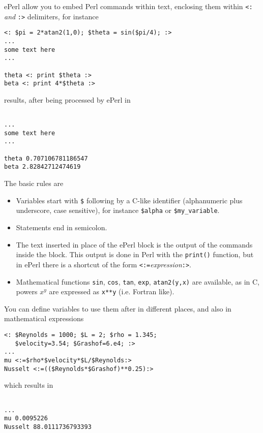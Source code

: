 
ePerl allow you to embed Perl commands within text, enclosing them
within \verb+<:+\emph{ and  }\verb+:>+ delimiters, for instance

\begin{verbatim}
<: $pi = 2*atan2(1,0); $theta = sin($pi/4); :>
...
some text here
...

theta <: print $theta :>
beta <: print 4*$theta :>
\end{verbatim}

results, after being processed by ePerl in

\begin{verbatim}
 
...
some text here
...

theta 0.707106781186547
beta 2.82842712474619
\end{verbatim}

The basic rules are

\begin{itemize}
\item Variables start with \verb+$+ following by a C-like identifier
(alphanumeric plus underscore, case sensitive), for instance \verb+$alpha+ or
\verb+$my_variable+. 
\item Statements end in semicolon. 
\item The text inserted in place of the ePerl block is the output of
the commands inside the block. This output is done in Perl with
the \verb+print()+ function, but in ePerl there is a shortcut of the
form \verb+<:=+\emph{expression}\verb+:>+. 
\item Mathematical functions \verb+sin+, \verb+cos+, \verb+tan+, \verb+exp+,
        \verb+atan2(y,x)+ are available, as in C, powers $x^y$ are expressed
        as \verb+x**y+ (i.e. Fortran like). 
\end{itemize}


You can define variables to use them after in different places, and
also in mathematical expressions

\begin{verbatim}
<: $Reynolds = 1000; $L = 2; $rho = 1.345; 
   $velocity=3.54; $Grashof=6.e4; :>
...
mu <:=$rho*$velocity*$L/$Reynolds:>
Nusselt <:=(($Reynolds*$Grashof)**0.25):>
\end{verbatim}
%
which results in
%
\begin{verbatim}

...
mu 0.0095226
Nusselt 88.0111736793393
\end{verbatim}

